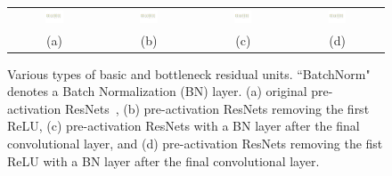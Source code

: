 \documentclass[10pt,twocolumn,letterpaper]{article}
\begin{document}
\begin{figure}[t]
\begin{center}
\begin{tabular}{cccc}
\includegraphics[trim = 0mm 0mm 180mm 0mm, clip, width=0.21\textwidth, height=0.29\textwidth]{Images2/resnets2_final.pdf} & \quad
\includegraphics[trim = 60mm 0mm 120mm 0mm, clip, width=0.21\textwidth, height=0.29\textwidth]{Images2/resnets2_final.pdf} & \quad
\includegraphics[trim = 120mm 0mm 60mm 0mm, clip, width=0.21\textwidth, height=0.29\textwidth]{Images2/resnets2_final.pdf} & \quad
\includegraphics[trim = 180mm 0mm 0mm 0mm, clip, width=0.21\textwidth, height=0.29\textwidth]{Images2/resnets2_final.pdf} \\
\quad  (a) & \quad \quad (b) & \quad \quad  (c) & \quad \quad (d)
\end{tabular}
\end{center}
\caption{Various types of basic and bottleneck residual units. ``BatchNorm" denotes a Batch Normalization (BN) layer. (a) original pre-activation ResNets~\cite{preresnet}, (b) pre-activation ResNets removing the first ReLU, (c) pre-activation ResNets with a BN layer after the final convolutional layer, and (d) pre-activation ResNets removing the fist ReLU with a BN layer after the final convolutional layer.}
\label{fig:resnets}
\end{figure}
\end{document}
